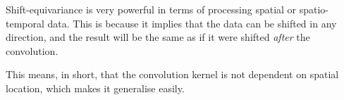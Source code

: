 \documentclass[twoside]{article}
\begin{document}
Shift-equivariance is very powerful in terms of processing spatial or spatio-temporal data.
This is because it implies that the data can be shifted in any direction, and the result
will be the same as if it were shifted \textit{after} the convolution.

This means, in short, that the convolution kernel is not dependent on spatial location,
which makes it generalise easily.
\end{document}
